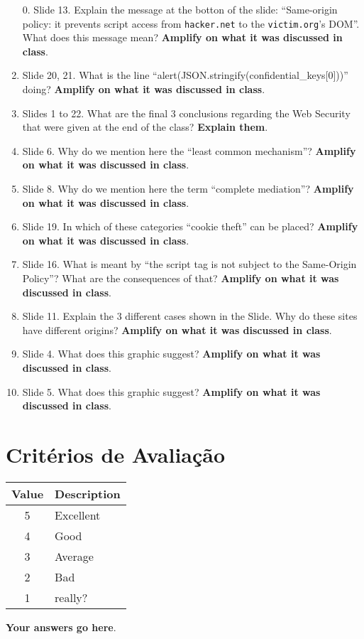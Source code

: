 \documentclass{article}
\begin{document}
\bigskip
\bigskip

\begin{enumerate}
\item[0.] Slide 13. Explain the message at the botton of the slide: ``Same-origin policy: it
  prevents script access from \texttt{hacker.net} to the \texttt{victim.org}’s
  DOM''. What does this message mean? 
  \textbf{Amplify on what it was discussed in class}.
\item Slide 20, 21. What is the line ``alert(JSON.stringify(confidential\_keys[0]))''
  doing? \textbf{Amplify on what it was discussed in class}.
\item Slides 1 to 22. What are the final 3 conclusions regarding the
  Web Security that were given at the end of the class?
  \textbf{Explain them}. 
\item Slide 6. Why do we mention here the ``least common mechanism''? \textbf{Amplify on what it
  was discussed in class}.
\item Slide 8. Why do we mention here the term ``complete mediation''? \textbf{Amplify on what it
  was discussed in class}. 
\item Slide 19. In which of these categories ``cookie theft'' can be placed? \textbf{Amplify on
  what it was discussed in class}. 
\item Slide 16. What is meant by ``the script  tag is not subject to the Same-Origin
  Policy''? What are the consequences of that? 
  \textbf{Amplify on what it was discussed in class}.
\item Slide 11. Explain the 3 different cases shown in the Slide. Why do these sites
  have different origins?  \textbf{Amplify on what it was discussed in class}. 
\item Slide 4. What does this graphic suggest? \textbf{Amplify on what it
  was discussed in class}. 
\item Slide 5. What does this graphic suggest? \textbf{Amplify on what it
  was discussed in class}.
\end{enumerate}


\bigskip

\section*{Critérios de Avaliação}

\begin{tabular}{|c|p{2cm}|} \hline
  \textbf{Value} & \textbf{Description} \\ \hline
  5 & Excellent \\ \hline
  4 & Good  \\ \hline 
  3 & Average  \\ \hline 
  2 & Bad \\ \hline 
  1 & really? \\ \hline 
\end{tabular}

\bigskip 

\bigskip 

\bigskip

\textbf{Your answers go here}.
\end{document}

